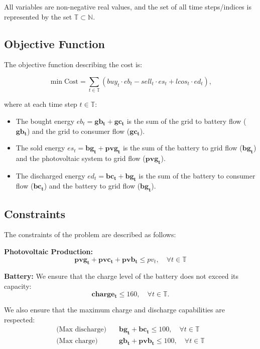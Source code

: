 \documentclass[12pt]{article}
\newcommand{\VAR}[1]{\mathbf{#1}}
\newcommand{\T}{\mathbb{T}}
\begin{document}
All variables are non-negative real values, and the set of all time steps/indices is represented by the set \(\T \subset \mathbb{N}\).

\subsection{Objective Function}
The objective function describing the cost is:

\begin{equation}
    \min \text{Cost} = \sum_{t \in \T} \left( buy_t \cdot eb_t - sell_t \cdot es_t + lcos_t \cdot ed_t \right),
    \label{eq:cost}
\end{equation}

where at each time step \(t \in \T\):
\begin{itemize}
    \item The bought energy \(eb_t = \VAR{gb_t} + \VAR{gc_t}\) is the sum of the grid to battery flow (\(\VAR{gb_t}\)) and the grid to consumer flow (\(\VAR{gc_t}\)).
    \item The sold energy \(es_t = \VAR{bg_t} + \VAR{pvg_t}\) is the sum of the battery to grid flow (\(\VAR{bg_t}\)) and the photovoltaic system to grid flow (\(\VAR{pvg_t}\)).
    \item The discharged energy \(ed_t = \VAR{bc_t} + \VAR{bg_t}\) is the sum of the battery to consumer flow (\(\VAR{bc_t}\)) and the battery to grid flow (\(\VAR{bg_t}\)).
\end{itemize}

\subsection{Constraints}
The constraints of the problem are described as follows:

\textbf{Photovoltaic Production:}
\begin{equation}
    \VAR{pvg_t} + \VAR{pvc_t} + \VAR{pvb_t} \leq pv_t, \quad \forall t \in \T
\end{equation}

\textbf{Battery:}
We ensure that the charge level of the battery does not exceed its capacity:
\begin{equation}
    \VAR{charge_t} \leq 160, \quad \forall t \in \T.
    \label{eq:charge}
\end{equation}

We also ensure that the maximum charge and discharge capabilities are respected:
\begin{align}
\text{(Max discharge)} & \quad \VAR{bg_t} + \VAR{bc_t} \leq 100, \quad \forall t \in \T \\
\text{(Max charge)} & \quad \VAR{gb_t} + \VAR{pvb_t} \leq 100, \quad \forall t \in \T
\end{align}
\end{document}
